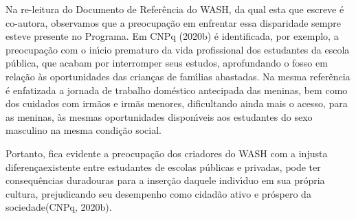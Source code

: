 \documentclass[
12pt,		%
openright,	%
twoside,  %
a4paper,			%
chapter=TITLE,		%
english,			%
french,				%
spanish,			%
brazil				%
]{USPSC-classe/USPSC}
\begin{document}
\noindent\begin{center}\mbox{\centering{}}\end{center}


Na re-leitura do Documento de Refer\^encia do WASH, da qual esta que escreve \'e co-autora, observamos que a preocupa\c{c}\~ao em enfrentar essa disparidade sempre esteve presente no Programa. Em  CNPq (2020b) \'e identificada, por exemplo, a preocupa\c{c}\~ao com o in\'{\i}cio prematuro da vida profissional dos estudantes da escola p\'ublica, que acabam por interromper seus estudos, aprofundando o fosso em rela\c{c}\~ao \`as oportunidades das crian\c{c}as de fam\'{\i}lias abastadas. Na mesma refer\^encia \'e enfatizada a jornada de trabalho dom\'estico antecipada  das meninas, bem como dos cuidados com irm\~aos e irm\~as menores, dificultando ainda mais o acesso, para as meninas, \`as mesmas oportunidades dispon\'{\i}veis aos estudantes do sexo masculino na mesma condi\c{c}\~ao social.








Portanto, fica evidente a preocupa\c{c}\~ao dos criadores do WASH com a \textquotedbl injusta diferen\c{c}a\textquotedbl  existente entre estudantes de escolas p\'ublicas e privadas, \textquotedbl pode ter consequ\^encias duradouras para a inser\c{c}\~ao daquele indiv\'{\i}duo em sua pr\'opria cultura, prejudicando seu desempenho como cidad\~ao ativo e pr\'ospero da sociedade\textquotedbl   (CNPq, 2020b).









\noindent\begin{center}\mbox{\centering{}}\end{center}
\end{document}
